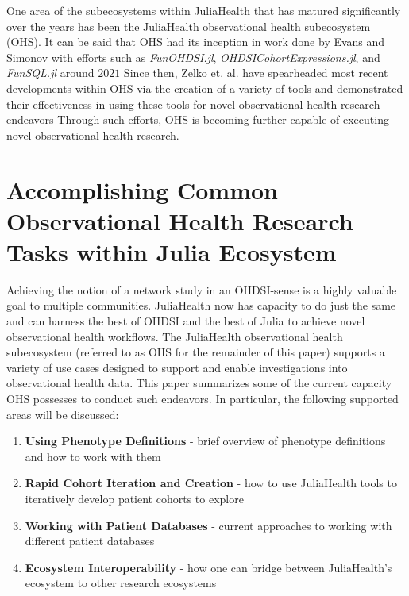 \documentclass{juliacon}
\begin{document}
One area of the subecosystems within JuliaHealth that has matured significantly over the years has been the JuliaHealth observational health subecosystem (OHS).
It can be said that OHS had its inception in work done by Evans and Simonov with efforts such as \textit{FunOHDSI.jl}, \textit{OHDSICohortExpressions.jl}, and \textit{FunSQL.jl} around $2021$ \cite{kirill_simonov_2023_7705325}
Since then, Zelko et. al. have spearheaded most recent developments within OHS via the creation of a variety of tools and demonstrated their effectiveness in using these tools for novel observational health research endeavors \cite{zelko2022pilot}
Through such efforts, OHS is becoming further capable of executing novel observational health research. 

\section{Accomplishing Common Observational Health Research Tasks within Julia Ecosystem}

Achieving the notion of a network study in an OHDSI-sense is a highly valuable goal to multiple communities.
JuliaHealth now has capacity to do just the same and can harness the best of OHDSI and the best of Julia to achieve novel observational health workflows.
The JuliaHealth observational health subecosystem (referred to as OHS for the remainder of this paper) supports a variety of use cases designed to support and enable investigations into observational health data.
This paper summarizes some of the current capacity OHS possesses to conduct such endeavors.
In particular, the following supported areas will be discussed:

\begin{enumerate}
\item \textbf{Using Phenotype Definitions} - brief overview of phenotype definitions and how to work with them
\item \textbf{Rapid Cohort Iteration and Creation} - how to use JuliaHealth tools to iteratively develop patient cohorts to explore
\item \textbf{Working with Patient Databases} - current approaches to working with different patient databases
\item \textbf{Ecosystem Interoperability} - how one can bridge between JuliaHealth's ecosystem to other research ecosystems
\end{enumerate}
\end{document}
